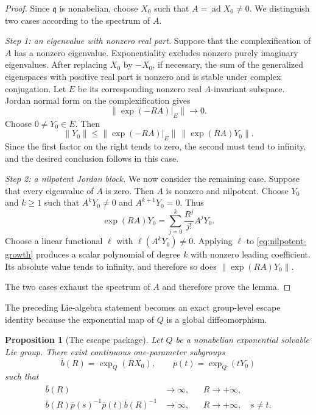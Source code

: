 \documentclass[10pt,a4paper]{amsart}
\numberwithin{equation}{section}
\newtheorem{proposition}[theorem]{Proposition}
\newcommand{\ad}{\operatorname{ad}}
\newcommand{\Step}[1]{\par\medskip\noindent\textit{#1.}\quad}
\begin{document}
\begin{proof}
Since $\mathfrak q$ is nonabelian, choose $X_0$ such that
$A=\ad X_0\neq0$.  We distinguish two cases according to the spectrum of
$A$.

\Step{Step 1: an eigenvalue with nonzero real part}
Suppose that the complexification of $A$ has a nonzero eigenvalue.
Exponentiality excludes nonzero purely imaginary eigenvalues.  After
replacing $X_0$ by $-X_0$, if necessary, the sum of the generalized
eigenspaces with positive real part is nonzero and is stable under complex
conjugation.  Let $E$ be its corresponding nonzero real $A$-invariant
subspace.  Jordan normal form on the complexification gives
\begin{equation}\label{eq:contracting-inverse}
 \|\exp(-RA)|_E\|\longrightarrow0.
\end{equation}
Choose $0\neq Y_0\in E$.  Then
\[
 \|Y_0\|
 \leq \|\exp(-RA)|_E\|\,\|\exp(RA)Y_0\|.
\]
Since the first factor on the right tends to zero, the second must tend to
infinity, and the desired conclusion follows in this case.

\Step{Step 2: a nilpotent Jordan block}
We now consider the remaining case.  Suppose that every eigenvalue of $A$ is
zero.  Then $A$ is nonzero and
nilpotent.  Choose $Y_0$ and $k\geq1$ such that
$A^kY_0\neq0$ and $A^{k+1}Y_0=0$.  Thus
\begin{equation}\label{eq:nilpotent-growth}
 \exp(RA)Y_0=\sum_{j=0}^{k}\frac{R^j}{j!}A^jY_0.
\end{equation}
Choose a linear functional $\ell$ with $\ell(A^kY_0)\neq0$.  Applying
$\ell$ to \eqref{eq:nilpotent-growth} produces a scalar polynomial of degree
$k$ with nonzero leading coefficient.  Its absolute value tends to infinity,
and therefore so does $\|\exp(RA)Y_0\|$.

The two cases exhaust the spectrum of $A$ and therefore prove the lemma.
\end{proof}

The preceding Lie-algebra statement becomes an exact group-level escape
identity because the exponential map of $Q$ is a global diffeomorphism.

\begin{proposition}[The escape package]
\label{prop:geometric-escape}
Let $Q$ be a nonabelian exponential solvable Lie group.  There exist continuous
one-parameter subgroups
\[
 \overline b(R)=\exp_Q(RX_0),
 \qquad
 \overline p(t)=\exp_Q(tY_0)
\]
such that
\begin{align}
 \overline b(R)&\longrightarrow\infty,
 &&R\to+\infty,                                  \label{eq:b-escape-Q}\\
 \overline b(R)\overline p(s)^{-1}\overline p(t)
 \overline b(R)^{-1}&\longrightarrow\infty,
 &&R\to+\infty,\quad s\neq t.                  \label{eq:conj-escape-Q}
\end{align}
\end{proposition}
\end{document}
